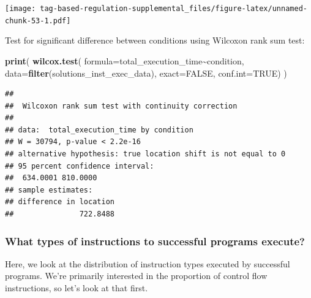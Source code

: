 \documentclass[
]{book}
\newenvironment{Shaded}{\begin{snugshade}}{\end{snugshade}}
\newcommand{\DataTypeTok}[1]{\textcolor[rgb]{0.13,0.29,0.53}{#1}}
\newcommand{\KeywordTok}[1]{\textcolor[rgb]{0.13,0.29,0.53}{\textbf{#1}}}
\newcommand{\NormalTok}[1]{#1}
\newcommand{\OperatorTok}[1]{\textcolor[rgb]{0.81,0.36,0.00}{\textbf{#1}}}
\newcommand{\OtherTok}[1]{\textcolor[rgb]{0.56,0.35,0.01}{#1}}
\begin{document}
\texttt{[image: tag-based-regulation-supplemental\_files/figure-latex/unnamed-chunk-53-1.pdf]}

Test for significant difference between conditions using Wilcoxon rank sum test:

\begin{Shaded}
\begin{Highlighting}[]
\KeywordTok{print}\NormalTok{(}
  \KeywordTok{wilcox.test}\NormalTok{(}
    \DataTypeTok{formula=}\NormalTok{total\_execution\_time}\OperatorTok{\textasciitilde{}}\NormalTok{condition,}
    \DataTypeTok{data=}\KeywordTok{filter}\NormalTok{(solutions\_inst\_exec\_data),}
    \DataTypeTok{exact=}\OtherTok{FALSE}\NormalTok{,}
    \DataTypeTok{conf.int=}\OtherTok{TRUE}\NormalTok{)}
\NormalTok{)}
\end{Highlighting}
\end{Shaded}

\begin{verbatim}
## 
##  Wilcoxon rank sum test with continuity correction
## 
## data:  total_execution_time by condition
## W = 30794, p-value < 2.2e-16
## alternative hypothesis: true location shift is not equal to 0
## 95 percent confidence interval:
##  634.0001 810.0000
## sample estimates:
## difference in location 
##               722.8488
\end{verbatim}

\hypertarget{what-types-of-instructions-to-successful-programs-execute}{%
\subsubsection{What types of instructions to successful programs execute?}\label{what-types-of-instructions-to-successful-programs-execute}}

Here, we look at the distribution of instruction types executed by successful programs.
We're primarily interested in the proportion of control flow instructions, so let's look at that first.
\end{document}
